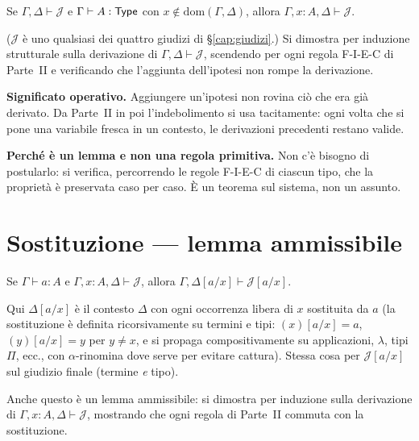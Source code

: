 \begin{regola}
Se $\Gamma, \Delta \vdash \mathcal{J}$ e $\Gamma \vdash A : \mathsf{Type}$ con $x \notin \mathrm{dom}(\Gamma, \Delta)$, allora $\Gamma, x : A, \Delta \vdash \mathcal{J}$.
\end{regola}

\noindent ($\mathcal{J}$ \`e uno qualsiasi dei quattro giudizi di \S\ref{cap:giudizi}.) Si dimostra per induzione strutturale sulla derivazione di $\Gamma, \Delta \vdash \mathcal{J}$, scendendo per ogni regola F-I-E-C di Parte~II e verificando che l'aggiunta dell'ipotesi non rompe la derivazione.

\bigskip

\noindent\textbf{Significato operativo.} Aggiungere un'ipotesi non rovina ci\`o che era gi\`a derivato. Da Parte~II in poi l'indebolimento si usa tacitamente: ogni volta che si pone una variabile fresca in un contesto, le derivazioni precedenti restano valide.

\bigskip

\noindent\textbf{Perch\'e \`e un lemma e non una regola primitiva.} Non c'\`e bisogno di postularlo: si verifica, percorrendo le regole F-I-E-C di ciascun tipo, che la propriet\`a \`e preservata caso per caso. \`E un teorema sul sistema, non un assunto.

\section*{Sostituzione --- lemma ammissibile}

\begin{regola}
Se $\Gamma \vdash a : A$ e $\Gamma, x : A, \Delta \vdash \mathcal{J}$, allora $\Gamma, \Delta[a/x] \vdash \mathcal{J}[a/x]$.
\end{regola}

\noindent Qui $\Delta[a/x]$ \`e il contesto $\Delta$ con ogni occorrenza libera di $x$ sostituita da $a$ (la sostituzione \`e definita ricorsivamente su termini e tipi: $(x)[a/x] = a$, $(y)[a/x] = y$ per $y \neq x$, e si propaga compositivamente su applicazioni, $\lambda$, tipi $\Pi$, ecc., con $\alpha$-rinomina dove serve per evitare cattura). Stessa cosa per $\mathcal{J}[a/x]$ sul giudizio finale (termine \emph{e} tipo).

Anche questo \`e un lemma ammissibile: si dimostra per induzione sulla derivazione di $\Gamma, x : A, \Delta \vdash \mathcal{J}$, mostrando che ogni regola di Parte~II commuta con la sostituzione.

